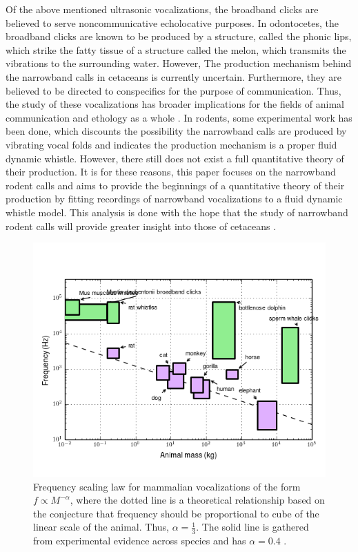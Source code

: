 \documentclass[twocolumn, prl]{revtex4}
\begin{document}
Of the above mentioned ultrasonic vocalizations, the broadband clicks are believed to serve noncommunicative echolocative purposes. In odontocetes, the broadband clicks are known to be produced by a structure, called the phonic lips, which strike the fatty tissue of a structure called the melon, which transmits the vibrations to the surrounding water. However, The production mechanism behind the narrowband calls in cetaceans is currently uncertain. Furthermore, they are believed to be directed to conspecifics for the purpose of communication. Thus, the study of these vocalizations has broader implications for the fields of animal communication and ethology as a whole \cite{Reidenberg2010}. In rodents, some experimental work has been done, which discounts the possibility the narrowband calls are produced by vibrating vocal folds and indicates the production mechanism is a proper fluid dynamic whistle. However, there still does not exist a full quantitative theory of their production. It is for these reasons, this paper focuses on the narrowband rodent calls and aims to provide the beginnings of a quantitative theory of their production by fitting recordings of narrowband vocalizations to a fluid dynamic whistle model. This analysis is done with the hope that the study of narrowband rodent calls will provide greater insight into those of cetaceans \cite{Riede2011,Riede2011a,Roberts1975}.
\begin{figure}
\begin{center}
\includegraphics[width=\columnwidth]{frequency_scaling.png}
\caption{\label{fig:frequency_scaling} Frequency scaling law for mammalian vocalizations of the form $f\propto M^{-\alpha}$, where the dotted line is a theoretical relationship based on the conjecture that frequency should be proportional to cube of the linear scale of the animal. Thus, $\alpha=\frac{1}{3}.$ The solid line is gathered from experimental evidence across species and has $\alpha=0.4$ \cite{Brudzynski2010,White1998,berry1970natural,Fenton1998,Jones2006,bogdanowicz1994,Frankel2009,Whitehead2009}.}
\end{center}
\end{figure}
\end{document}
